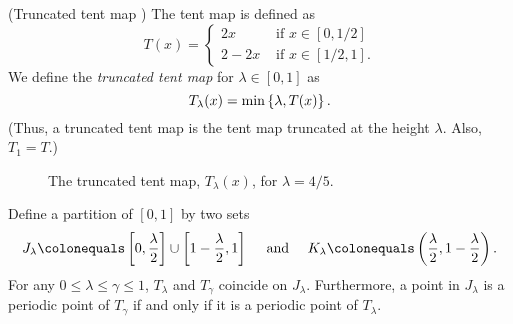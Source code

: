 \documentclass[10pt,twoside,draft]{book}
\begin{document}
\begin{example}
  (Truncated tent map \citep{aulbach})
  The tent map is defined as
  \begin{equation*}
    T(x) = 
    \begin{cases}
      2x     &\mbox{ if } x \in [0,1/2] \\
      2 - 2x &\mbox{ if } x \in [1/2,1].
    \end{cases}
  \end{equation*}
  We define the \textit{truncated tent map} for $\lambda \in [0,1]$ as 
  \begin{equation*}
    T_\lambda(x) = \min\left \{ \lambda, T(x) \right \}.
  \end{equation*}
  (Thus, a truncated tent map is the tent map truncated at the height $\lambda$.
  Also, $T_1 = T$.)

  \begin{figure}[th]
    \centering
    \label{fig:tent-map}
    \caption{The truncated tent map, $T_\lambda(x)$, for $\lambda = 4/5$.}
  \end{figure}
  Define a partition of $[0,1]$ by two sets
  \begin{equation*}
    J_\lambda \ceq \brac{0, \frac{\lambda}{2}} \cup \brac{1 - \frac{\lambda}{2}, 1} 
    \quad\mbox{ and }\quad
    K_\lambda \ceq \paren{\frac{\lambda}{2}, 1- \frac{\lambda}{2}}.
  \end{equation*}
  For any $0 \leq \lambda \leq \gamma \leq 1$, $T_\lambda$ and $T_\gamma$ coincide on $J_\lambda$.
  Furthermore, a point in $J_\lambda$ is a periodic point of $T_\gamma$ if and only if it is a periodic point of $T_\lambda$.


\end{example}
\end{document}
